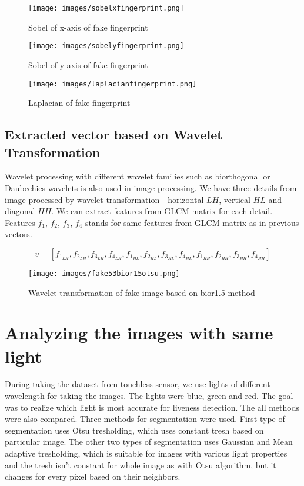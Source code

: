 \documentclass{article}
\begin{document}
\begin{figure}[htbp]
  \begin{minipage}[b]{0.3\linewidth}
    \centering
    \texttt{[image: images/sobelxfingerprint.png]}
    \caption{Sobel of x-axis of fake fingerprint}
  \end{minipage}
  \hspace{0.3cm}
  \begin{minipage}[b]{0.3\linewidth}
    \centering
    \texttt{[image: images/sobelyfingerprint.png]}
    \caption{Sobel of y-axis of fake fingerprint}
  \end{minipage}
  \hspace{0.3cm}
    \begin{minipage}[b]{0.3\linewidth}
    \centering
    \texttt{[image: images/laplacianfingerprint.png]}
    \caption{Laplacian of fake fingerprint}
  \end{minipage}
\end{figure}

\subsection{Extracted vector based on Wavelet Transformation}
Wavelet processing with different wavelet families such as biorthogonal or Daubechies wavelets is also used in image processing. We have three details from image processed by wavelet transformation - horizontal $LH$, vertical $HL$ and diagonal $HH$. We can extract features from GLCM matrix for each detail. Features $f_1$, $f_2$, $f_3$, $f_4$ stands for same features from GLCM matrix as in previous vectors.

$$v = [f_1_{LH}, f_2_{LH}, f_3_{LH}, f_4_{LH}, f_1_{HL}, f_2_{HL}, f_3_{HL}, f_4_{HL}, f_1_{HH}, f_2_{HH}, f_3_{HH}, f_4_{HH}]$$

\begin{figure}[htbp]
    \centering
    \texttt{[image: images/fake53bior15otsu.png]}
    \caption{Wavelet transformation of fake image based on bior1.5 method }
\end{figure}

\section{Analyzing the images with same light }
During taking the dataset from touchless sensor, we use lights of different wavelength for taking the images. The lights were blue, green and red. The goal was to realize which light is most accurate for liveness detection. The all methods were also compared. Three methods for segmentation were used. First type of segmentation uses Otsu tresholding, which uses constant tresh based on particular image. The other two types of segmentation uses Gaussian and Mean adaptive tresholding, which is suitable for images with various light properties and the tresh isn't constant for whole image as with Otsu algorithm, but it changes for every pixel based on their neighbors.  
\end{document}
